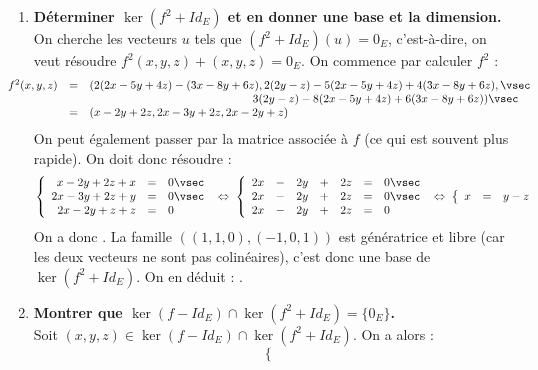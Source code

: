 \documentclass[a4paper, 11pt,reqno]{article}
\begin{document}
\begin{correction}
\begin{enumerate}
		\item \textbf{D\'eterminer $\ker (f^2+Id_E)$ et en donner une base et la dimension.}\\
		      On cherche les vecteurs $u$ tels que $(f^2+Id_E)(u) = 0_E$, c'est-\`a-dire, on veut r\'esoudre $f^2(x,y,z) + (x,y,z) = 0_E$. On commence par calculer $f^2$ :\\
		      $$\hspace*{-1cm} \begin{array}{rcl}
				      f^2(x,y,z) & = & (2(2x-5y+4z) - (3x-8y+6z), 2(2y-z) - 5(2x-5y+4z)+ 4(3x-8y+6z), \vsec \\
				                 &   & \hspace*{5cm} 3(2y-z)-8(2x-5y+4z)+6(3x-8y+6z))\vsec                  \\
				                 & = & (x -2y +2z, 2x -3y +2z, 2x-2y+z)
			      \end{array}$$
		      On peut \'egalement passer par la matrice associ\'ee \`a $f$ (ce qui est souvent plus rapide). On doit donc r\'esoudre :
		      $$\left\{ \begin{array}{rcl}
				      x -2y +2z + x  & = & 0\vsec  \\
				      2x -3y +2z + y & = & 0 \vsec \\
				      2x-2y+z +z     & = & 0
			      \end{array} \right.
			      \; \Leftrightarrow \;
			      \left\{ \begin{array}{rcrcrcl}
				      2 x & - & 2y & + & 2z & = & 0\vsec  \\
				      2x  & - & 2y & + & 2z & = & 0 \vsec \\
				      2x  & - & 2y & + & 2z & = & 0
			      \end{array} \right.
			      \; \Leftrightarrow \;
			      \left\{ \begin{array}{rcl}
				      x & = & y-z
			      \end{array} \right.$$
		      On a donc . La famille $((1,1,0),(-1,0,1))$ est g\'en\'eratrice et libre (car les deux vecteurs ne sont pas colin\'eaires), c'est donc une base de $\ker(f^2+Id_E)$. On en d\'eduit : .
		\item \textbf{Montrer que $\ker (f-Id_E)\cap \ker (f^2+Id_E)=\lbrace 0_E\rbrace$.}\\
		      Soit $(x,y,z) \in \ker (f-Id_E)\cap \ker (f^2+Id_E)$. On a alors :
		      $$\left\{ \begin{array}{rcrcrcl}

\end{array}$$
\end{enumerate}
\end{correction}
\end{document}
